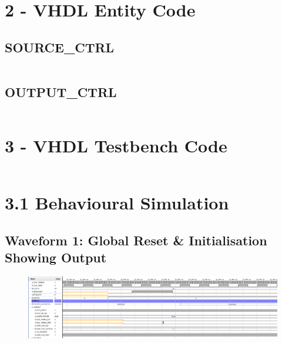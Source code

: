 \documentclass[11pt]{report}
\begin{document}
\section*{2 - VHDL Entity Code}
\subsection*{SOURCE\_CTRL}
\inputminted{vhdl}{../../../DE_Project_T2/DE_Project_T2.srcs/sources_1/imports/DigEng_Proj_T2_model/SOURCE_CTRL.vhd}

\newpage

\subsection*{OUTPUT\_CTRL}
\inputminted{vhdl}{../../../DE_Project_T2/DE_Project_T2.srcs/sources_1/imports/DigEng_Proj_T2_model/OUTPUT_CTRL.vhd}

\newpage

\section*{3 - VHDL Testbench Code}
\inputminted{vhdl}{../../../DE_Project_T2/DE_Project_T2.srcs/sim_1/imports/DigEng_Proj_T2_model/TOP_LEVEL_tb.vhd}

\newpage

\section*{3.1 Behavioural Simulation}

\subsection*{Waveform 1: Global Reset \& Initialisation Showing Output}
\begin{figure}[H]
    \includegraphics[width=\columnwidth]{Assets/Output_Reset.png}
\end{figure}
\end{document}
